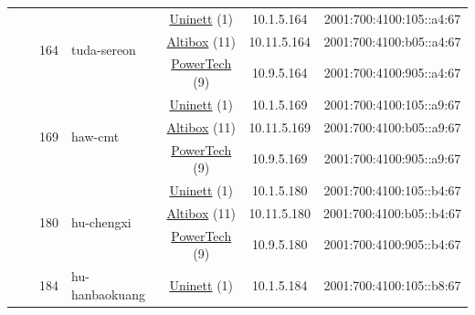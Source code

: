 \begin{small}
\begin{center}
\begin{longtable}{|c|c|c|c|c|c|c|c|}
  &  & \multirow{3}{*}{\tiny{164}} & \multicolumn{1}{|l|}{\multirow{3}{*}{\tiny{tuda-sereon}}} & \multicolumn{2}{|c|}{\tiny{\href{https://www.uninett.no}{Uninett} (1)}} & \tiny{10.1.5.164} & \tiny{2001:700:4100:105::a4:67} \\* \cline{5-5}\cline{6-6}\cline{7-7}\cline{8-8}
  &  &  &  & \multicolumn{2}{|c|}{\tiny{\href{https://www.altibox.no}{Altibox} (11)}} & \tiny{10.11.5.164} & \tiny{2001:700:4100:b05::a4:67} \\* \cline{5-5}\cline{6-6}\cline{7-7}\cline{8-8}
  &  &  &  & \multicolumn{2}{|c|}{\tiny{\href{http://www.powertech.no}{PowerTech} (9)}} & \tiny{10.9.5.164} & \tiny{2001:700:4100:905::a4:67} \\* \cline{3-3}\cline{4-4}\cline{5-5}\cline{6-6}\cline{7-7}\cline{8-8}
  &  & \multirow{3}{*}{\tiny{169}} & \multicolumn{1}{|l|}{\multirow{3}{*}{\tiny{haw-cmt}}} & \multicolumn{2}{|c|}{\tiny{\href{https://www.uninett.no}{Uninett} (1)}} & \tiny{10.1.5.169} & \tiny{2001:700:4100:105::a9:67} \\* \cline{5-5}\cline{6-6}\cline{7-7}\cline{8-8}
  &  &  &  & \multicolumn{2}{|c|}{\tiny{\href{https://www.altibox.no}{Altibox} (11)}} & \tiny{10.11.5.169} & \tiny{2001:700:4100:b05::a9:67} \\* \cline{5-5}\cline{6-6}\cline{7-7}\cline{8-8}
  &  &  &  & \multicolumn{2}{|c|}{\tiny{\href{http://www.powertech.no}{PowerTech} (9)}} & \tiny{10.9.5.169} & \tiny{2001:700:4100:905::a9:67} \\* \cline{3-3}\cline{4-4}\cline{5-5}\cline{6-6}\cline{7-7}\cline{8-8}
  &  & \multirow{3}{*}{\tiny{180}} & \multicolumn{1}{|l|}{\multirow{3}{*}{\tiny{hu-chengxi}}} & \multicolumn{2}{|c|}{\tiny{\href{https://www.uninett.no}{Uninett} (1)}} & \tiny{10.1.5.180} & \tiny{2001:700:4100:105::b4:67} \\* \cline{5-5}\cline{6-6}\cline{7-7}\cline{8-8}
  &  &  &  & \multicolumn{2}{|c|}{\tiny{\href{https://www.altibox.no}{Altibox} (11)}} & \tiny{10.11.5.180} & \tiny{2001:700:4100:b05::b4:67} \\* \cline{5-5}\cline{6-6}\cline{7-7}\cline{8-8}
  &  &  &  & \multicolumn{2}{|c|}{\tiny{\href{http://www.powertech.no}{PowerTech} (9)}} & \tiny{10.9.5.180} & \tiny{2001:700:4100:905::b4:67} \\* \cline{3-3}\cline{4-4}\cline{5-5}\cline{6-6}\cline{7-7}\cline{8-8}
  &  & \multirow{3}{*}{\tiny{184}} & \multicolumn{1}{|l|}{\multirow{3}{*}{\tiny{hu-hanbaokuang}}} & \multicolumn{2}{|c|}{\tiny{\href{https://www.uninett.no}{Uninett} (1)}} & \tiny{10.1.5.184} & \tiny{2001:700:4100:105::b8:67} \\* \cline{5-5}\cline{6-6}\cline{7-7}\cline{8-8}

\end{longtable}
\end{center}
\end{small}

